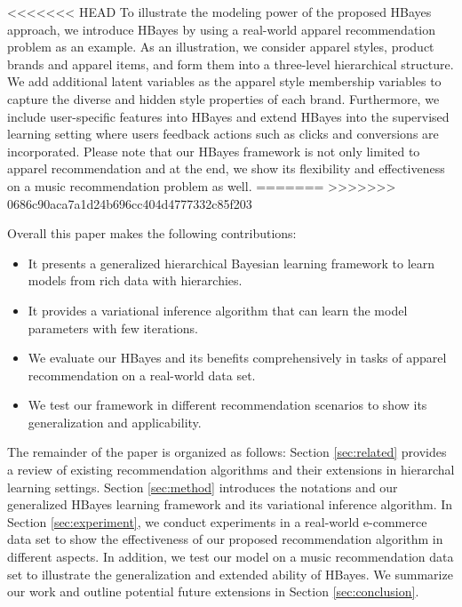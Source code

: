 <<<<<<< HEAD
To illustrate the modeling power of the proposed HBayes approach, we introduce HBayes by using a real-world apparel recommendation problem as an example. As an illustration, we consider apparel styles, product brands and apparel items,  and form them into a three-level hierarchical structure. We add additional latent variables as the apparel style membership variables to capture the diverse and hidden style properties of each brand. Furthermore, we include user-specific features into HBayes and extend HBayes into the supervised learning setting where users feedback actions such as clicks and conversions are incorporated. Please note that our HBayes framework is not only limited to apparel recommendation and at the end, we show its flexibility and effectiveness on a music recommendation problem as well.
=======
>>>>>>> 0686c90aca7a1d24b696cc404d4777332c85f203

Overall this paper makes the following contributions:

\begin{itemize}
\item It presents a generalized hierarchical Bayesian learning framework to learn models from rich data with hierarchies.
\item It provides a variational inference algorithm that can learn the model parameters with few iterations.
\item We evaluate our HBayes and its benefits comprehensively in tasks of apparel recommendation on a real-world data set. 
\item We test our framework in different recommendation scenarios to show its generalization and applicability.
\end{itemize}

The remainder of the paper is organized as follows: Section \ref{sec:related} provides a review of existing recommendation algorithms and their extensions in hierarchal learning settings. Section \ref{sec:method} introduces the notations and our generalized HBayes learning framework and its variational inference algorithm. In Section \ref{sec:experiment}, we conduct experiments in a real-world e-commerce data set to show the effectiveness of our proposed recommendation algorithm in different aspects. In addition, we test our model on a music recommendation data set to illustrate the generalization and extended ability of HBayes. We summarize our work and outline potential future extensions in Section \ref{sec:conclusion}.


